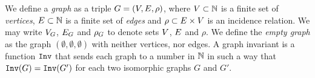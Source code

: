 We define a \emph{graph} as a triple $G = (V,E,\rho)$, where $V \subset \mathbb{N}$ is a finite set of \emph{vertices}, $E \subset \mathbb{N}$ is a finite set of \emph{edges} and $\rho \subset E \times V$ is an incidence relation. 
We may write $V_G$, $E_G$ and $\rho_G$ to denote sets $V$, $E$ and $\rho$. We define the \emph{empty graph} as the graph $(\emptyset,\emptyset,\emptyset)$ with neither vertices, nor edges. 
A graph invariant is a function $\texttt{Inv}$ that sends each graph to a number in $\mathbb{N}$ in such a way that $\texttt{Inv}(G)=\texttt{Inv}(G')$ for each two isomorphic graphs $G$ and $G'$. 




